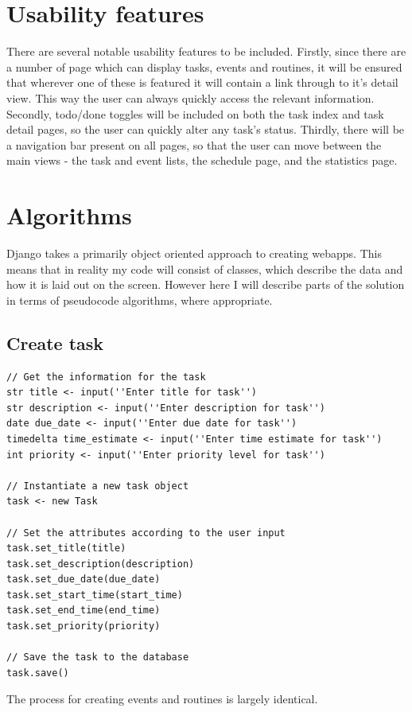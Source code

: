 \documentclass{article}
\begin{document}
\section{Usability features}
There are several notable usability features to be included.
Firstly, since there are a number of page which can display tasks, events and routines,
it will be ensured that wherever one of these is featured it will contain a link through to it's detail view.
This way the user can always quickly access the relevant information.
Secondly, todo/done toggles will be included on both the task index and task detail pages,
so the user can quickly alter any task's status.
Thirdly, there will be a navigation bar present on all pages,
so that the user can move between the main views -
the task and event lists,
the schedule page,
and the statistics page.

\section{Algorithms}
Django takes a primarily object oriented approach to creating webapps.
This means that in reality my code will consist of classes,
which describe the data and how it is laid out on the screen.
However here I will describe parts of the solution in terms of pseudocode algorithms,
where appropriate.

\subsection{Create task}
\begin{lstlisting}[breaklines]
// Get the information for the task
str title <- input(''Enter title for task'')
str description <- input(''Enter description for task'')
date due_date <- input(''Enter due date for task'')
timedelta time_estimate <- input(''Enter time estimate for task'')
int priority <- input(''Enter priority level for task'')

// Instantiate a new task object
task <- new Task

// Set the attributes according to the user input
task.set_title(title)
task.set_description(description)
task.set_due_date(due_date)
task.set_start_time(start_time)
task.set_end_time(end_time)
task.set_priority(priority)

// Save the task to the database
task.save()
\end{lstlisting}

The process for creating events and routines is largely identical.
\end{document}
